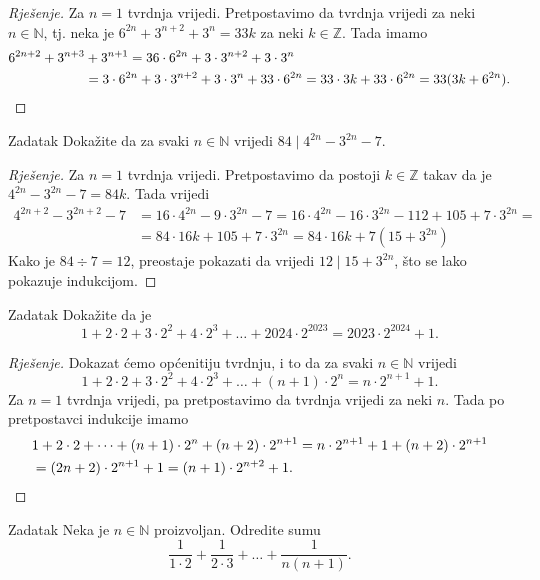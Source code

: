 \begin{proof}[Rješenje]
Za \(n=1\) tvrdnja vrijedi. Pretpostavimo da tvrdnja vrijedi za neki \(n\in \mathbb{N}\), tj. neka je \(6^{2n}+3^{n+2}+3^n=33k\) za neki \(k\in \mathbb{Z}\). Tada imamo
\begin{align*}
6^{2n+2}+3^{n+3}&+3^{n+1}=36\cdot 6^{2n}+3\cdot 3^{n+2}+3\cdot 3^n\\
&=3\cdot 6^{2n}+3\cdot 3^{n+2}+3\cdot 3^n+33\cdot 6^{2n}=33\cdot 3k+33\cdot 6^{2n}=33(3k+6^{2n}).\qedhere
\end{align*}
\end{proof}
\begin{exercise}{Zadatak}
Dokažite da za svaki \(n\in \mathbb{N}\) vrijedi \(84\; |\; 4^{2n}-3^{2n}-7\).
\end{exercise}
\begin{proof}[Rješenje]
Za \(n=1\) tvrdnja vrijedi. Pretpostavimo da postoji \(k\in \mathbb{Z}\) takav da je \(4^{2n}-3^{2n}-7=84k\). Tada vrijedi
\begin{align*}
4^{2n+2}-3^{2n+2}-7&=16\cdot 4^{2n}-9\cdot 3^{2n}-7=16\cdot 4^{2n}-16\cdot 3^{2n}-112+105+7\cdot 3^{2n}=\\
&=84\cdot 16k+105+7\cdot 3^{2n}=84\cdot 16k+7(15+3^{2n})
\end{align*}
Kako je \(84\div 7=12\), preostaje pokazati da vrijedi \(12 \; |\; 15+3^{2n}\), što se lako pokazuje indukcijom.
\end{proof}
\begin{exercise}{Zadatak}
Dokažite da je
\[1+2\cdot 2+3\cdot 2^2+4\cdot 2^3+\dots+2024\cdot 2^{2023}=2023\cdot 2^{2024}+1.\]
\end{exercise}
\begin{proof}[Rješenje]
Dokazat ćemo općenitiju tvrdnju, i to da za svaki \(n\in \mathbb{N}\) vrijedi
\[1+2\cdot 2+3\cdot 2^2+4\cdot 2^3+\dots+(n+1)\cdot 2^{n}=n\cdot 2^{n+1}+1.\]
Za \(n=1\) tvrdnja vrijedi, pa pretpostavimo da tvrdnja vrijedi za neki \(n\). Tada po pretpostavci indukcije imamo
\begin{align*}
&1+2\cdot 2+\dots+(n+1)\cdot 2^{n}+(n+2)\cdot 2^{n+1}=n\cdot 2^{n+1}+1+(n+2)\cdot 2^{n+1}\\
&=(2n+2)\cdot 2^{n+1}+1=(n+1)\cdot 2^{n+2}+1.\qedhere
\end{align*}
\end{proof}
\begin{exercise}{Zadatak}
Neka je \(n\in \mathbb{N}\) proizvoljan. Odredite sumu
\[\dfrac{1}{1\cdot 2}+\dfrac{1}{2\cdot 3}+\dots+\dfrac{1}{n(n+1)}.\]
\end{exercise}
